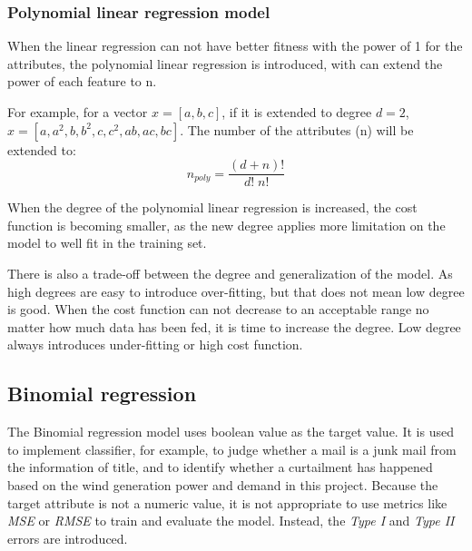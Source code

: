 \documentclass[12pt,a4paper]{report}
\begin{document}


        \subsubsection{Polynomial linear regression model}
        When the linear regression can not have better fitness with the power of 1 for the attributes, the polynomial linear regression is introduced, with can extend the power of each feature to n.

        For example, for a vector $x = [a, b, c]$, if it is extended to degree $d = 2$, $x = [a, a^2, b, b^2, c, c^2, ab, ac, bc]$. The number of the attributes (n) will be extended to:
        \begin{equation}
            n_{poly}=\frac{(d+n)!}{d!\;n!}
        \end{equation}

        When the degree of the polynomial linear regression is increased, the cost function is becoming smaller, as the new degree applies more limitation on the model to well fit in the training set.

        There is also a trade-off between the degree and generalization of the model. As high degrees are easy to introduce over-fitting, but that does not mean low degree is good. When the cost function can not decrease to an acceptable range no matter how much data has been fed, it is time to increase the degree. Low degree always introduces under-fitting or high cost function.

        \subsection{Binomial regression}
        The Binomial regression model uses boolean value as the target value. It is used to implement classifier, for example, to judge whether a mail is a junk mail from the information of title, and to identify whether a curtailment has happened based on the wind generation power and demand in this project.
        Because the target attribute is not a numeric value, it is not appropriate to use metrics like \emph{MSE} or \emph{RMSE} to train and evaluate the model. Instead, the \emph{Type I} and \emph{Type II} errors are introduced.
\end{document}
